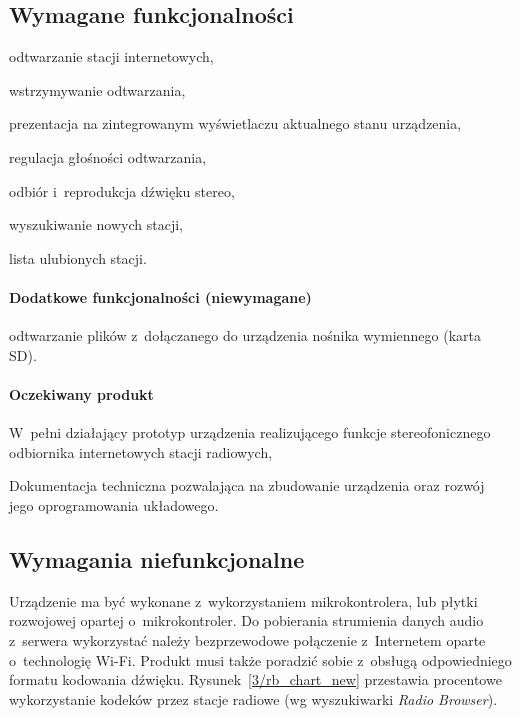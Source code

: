 \documentclass[polish]{aghengthesis}
\let\tempone\itemize
\let\temptwo\enditemize
\renewenvironment{itemize}{\tempone\setlength{\itemsep}{0cm}}{\temptwo}
\begin{document}
		
		\subsection{Wymagane funkcjonalności}
			\begin{itemize}
				\item odtwarzanie stacji internetowych,
				\item wstrzymywanie odtwarzania,
				\item prezentacja na zintegrowanym wyświetlaczu aktualnego stanu urządzenia,
				\item regulacja głośności odtwarzania,
				\item odbiór i~reprodukcja dźwięku stereo,
				\item wyszukiwanie nowych stacji,
				\item lista ulubionych stacji.
			\end{itemize}
			
			\paragraph{Dodatkowe funkcjonalności (niewymagane)}
			\begin{itemize}
				\item odtwarzanie plików z~dołączanego do urządzenia nośnika wymiennego (karta SD).
			\end{itemize}
		
			\paragraph{Oczekiwany produkt}
			\begin{itemize}
				\item W~pełni działający prototyp urządzenia realizującego funkcje stereofonicznego odbiornika internetowych stacji radiowych,
				\item Dokumentacja techniczna pozwalająca na zbudowanie urządzenia oraz rozwój jego oprogramowania układowego.
			\end{itemize}
		
		\subsection{Wymagania niefunkcjonalne}
			Urządzenie ma być wykonane z~wykorzystaniem mikrokontrolera, lub płytki rozwojowej opartej o~mikrokontroler.
			Do pobierania strumienia danych audio z~serwera wykorzystać należy  bezprzewodowe połączenie z~Internetem oparte o~technologię Wi-Fi.
			Produkt musi także poradzić sobie z~obsługą odpowiedniego formatu kodowania dźwięku.
			Rysunek~\ref{3/rb_chart_new} przestawia procentowe wykorzystanie kodeków przez stacje radiowe (wg wyszukiwarki \textit{Radio Browser}\textsuperscript{\cite{radio_browser_codecs}}).
			
\end{document}
